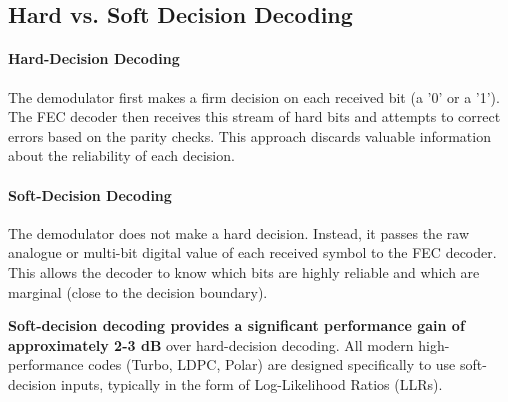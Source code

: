 \subsection{Hard vs. Soft Decision Decoding}

\paragraph{Hard-Decision Decoding}
The demodulator first makes a firm decision on each received bit (a '0' or a '1'). The FEC decoder then receives this stream of hard bits and attempts to correct errors based on the parity checks. This approach discards valuable information about the reliability of each decision.

\paragraph{Soft-Decision Decoding}
The demodulator does not make a hard decision. Instead, it passes the raw analogue or multi-bit digital value of each received symbol to the FEC decoder. This allows the decoder to know which bits are highly reliable and which are marginal (close to the decision boundary).
\begin{warningbox}
    \textbf{Soft-decision decoding provides a significant performance gain of approximately 2-3 dB} over hard-decision decoding. All modern high-performance codes (Turbo, LDPC, Polar) are designed specifically to use soft-decision inputs, typically in the form of Log-Likelihood Ratios (LLRs).
\end{warningbox}


